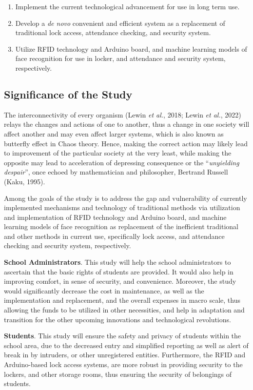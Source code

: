 \documentclass[12pt]{article}
\newcommand{\etl}{\textit{et al.}}
\begin{document}
\begin{enumerate}
	\item Implement the current technological advancement for use in long term use.
	\item Develop a \textit{de novo} convenient and efficient system as a replacement of traditional lock access, attendance checking, and security system.
	\item Utilize RFID technology and Arduino board, and machine learning models of face recognition for use in locker, and attendance and security system, respectively.
\end{enumerate}

\subsection*{Significance of the Study\centering}

The interconnectivity of every organism (Lewin \etl, 2018; Lewin \etl, 2022) relays the changes and actions of one to another, thus a change in one society will affect another and may even affect larger systems, which is also known as butterfly effect in Chaos theory. Hence, making the correct action may likely lead to improvement of the particular society at the very least, while making the opposite may lead to acceleration of depressing consequence or the ``\textit{unyielding despair}'', once echoed by mathematician and philosopher, Bertrand Russell (Kaku, 1995).

Among the goals of the study is to address the gap and vulnerability of currently implemented mechanisms and technology of traditional methods via utilization and implementation of RFID technology and Arduino board, and machine learning models of face recognition as replacement of the inefficient traditional and other methods in current use, specifically lock access, and attendance checking and security system, respectively.

\textbf{School Administrators}. This study will help the school administrators to ascertain that the basic rights of students are provided. It would also help in improving comfort, in sense of security, and convenience. Moreover, the study would significantly decrease the cost in maintenance, as well as the implementation and replacement, and the overall expenses in macro scale, thus allowing the funds to be utilized in other necessities, and help in adaptation and transition for the other upcoming innovations and technological revolutions.

\textbf{Students}. This study will ensure the safety and privacy of students within the school area, due to the decreased entry and simplified reporting as well as alert of break in by intruders, or other unregistered entities. Furthermore, the RFID and Arduino-based lock access systems, are more robust in providing security to the lockers, and other storage rooms, thus ensuring the security of belongings of students.
\end{document}
